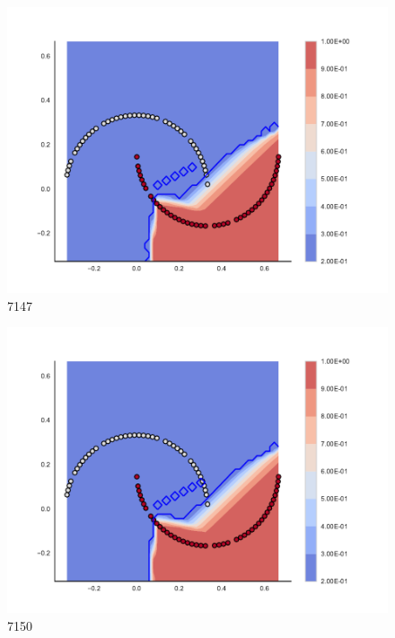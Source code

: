 \begin{subfigure}[b]{0.09\textwidth}
    \includegraphics[clip, trim=2.35cm 1.75cm 4.5cm 0cm,width=\textwidth]{img/convergence/7147.pdf}
    \caption{7147}
    \label{fig:convergence_7147}
\end{subfigure}
%
\begin{subfigure}[b]{0.09\textwidth}
    \includegraphics[clip, trim=2.35cm 1.75cm 4.5cm 0cm,width=\textwidth]{img/convergence/7150.pdf}
    \caption{7150}
    \label{fig:convergence_7150}
\end{subfigure}
%
